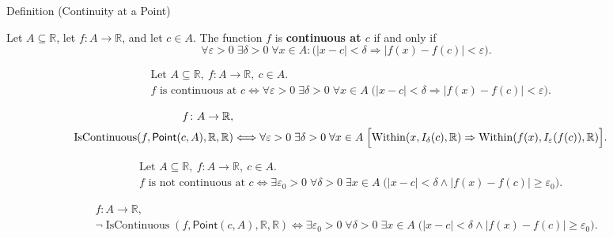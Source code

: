 \begin{definitionbox}{Definition (Continuity at a Point)}
\begin{definition}
\label{def:continuous-at-point}
Let $A \subseteq \mathbb{R}$, let $f : A \to \mathbb{R}$, and let $c \in A$. The function $f$ is \textbf{continuous at $c$} if and only if
\[
\forall \varepsilon > 0 \;\exists \delta > 0 \;\forall x \in A :
\bigl(|x-c| < \delta \Rightarrow |f(x)-f(c)| < \varepsilon\bigr).
\]
\end{definition}
\end{definitionbox}

\begin{remark*}
\[
\begin{aligned}
&\text{Let } A \subseteq \mathbb{R},\ f:A\to\mathbb{R},\ c\in A.\\
&f \text{ is continuous at } c
\Longleftrightarrow
\forall \varepsilon>0\;\exists \delta>0\;\forall x\in A\;
\bigl(|x-c|<\delta \Rightarrow |f(x)-f(c)|<\varepsilon\bigr).
\end{aligned}
\]
\end{remark*}

\begin{remark*}
\[
\begin{aligned}
  f\colon A\to\mathbb{R},\\
\operatorname{IsContinuous}(f,\mathsf{Point}(c,A),\mathbb R,\mathbb R)
&\Longleftrightarrow
\forall \varepsilon>0\;\exists \delta>0\;\forall x\in A\;
\Bigl[
  \operatorname{Within}(x,I_\delta(c),\mathbb R)
  \Rightarrow
  \operatorname{Within}(f(x),I_\varepsilon(f(c)),\mathbb R)
\Bigr].
\end{aligned}
\]
\end{remark*}

\begin{remark*}
\[
\begin{aligned}
&\text{Let } A \subseteq \mathbb{R},\ f:A\to\mathbb{R},\ c\in A.\\
&f \text{ is not continuous at } c
\Longleftrightarrow
\exists \varepsilon_0>0\;\forall \delta>0\;\exists x\in A\;
\bigl(|x-c|<\delta \land |f(x)-f(c)| \ge \varepsilon_0\bigr).
\end{aligned}
\]
\end{remark*}

\begin{remark*}
\[
\begin{aligned}
  f\colon A\to\mathbb{R},\\
\neg\operatorname{IsContinuous}(f,\mathsf{Point}(c,A),\mathbb R,\mathbb R)
\Longleftrightarrow
\exists \varepsilon_0>0\;\forall \delta>0\;\exists x\in A\;
\bigl(|x-c|<\delta \land |f(x)-f(c)| \ge \varepsilon_0\bigr).
\end{aligned}
\]
\end{remark*}

